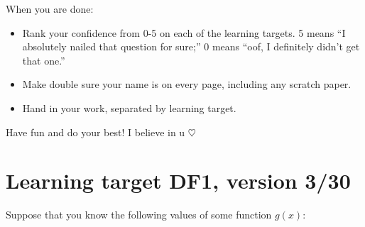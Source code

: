 When you are done:
\begin{itemize}
    \item Rank your confidence from 0-5 on each of the learning targets. 5 means ``I absolutely nailed that question for sure;'' 0 means ``oof, I definitely didn't get that one.''
    \item Make double sure your name is on every page, including any scratch paper.
    \item Hand in your work, separated by learning target.
\end{itemize}

Have fun and do your best! I believe in u $\heartsuit$


\pagebreak
\section{Learning target DF1, version 3/30}


\everymath{\displaystyle}

Suppose that you know the following values of some function $g(x)$:

